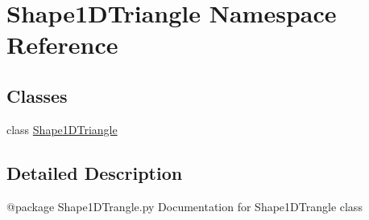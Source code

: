 \hypertarget{namespaceShape1DTriangle}{\section{Shape1\-D\-Triangle Namespace Reference}
\label{namespaceShape1DTriangle}
}
\subsection*{Classes}
\begin{DoxyCompactItemize}
\item 
class \hyperlink{classShape1DTriangle_1_1Shape1DTriangle}{Shape1\-D\-Triangle}
\end{DoxyCompactItemize}


\subsection{Detailed Description}
\begin{DoxyVerb}@package Shape1DTrangle.py
Documentation for Shape1DTrangle class
\end{DoxyVerb}
 